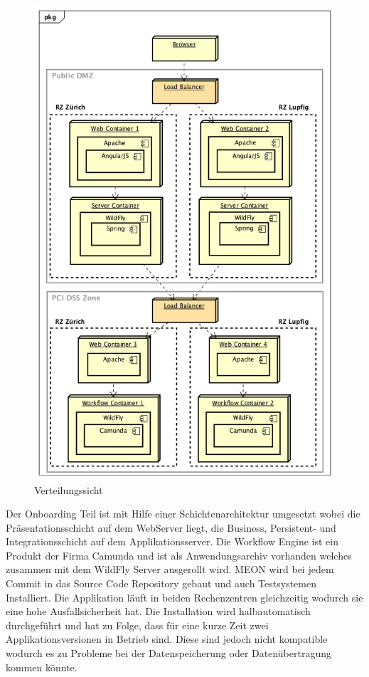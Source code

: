 \begin{figure}[H]
	\centering
	\includegraphics[scale=0.6]{CurrentDeployment.png}
	\caption{Verteilungssicht}
\end{figure}
Der Onboarding Teil ist mit Hilfe einer Schichtenarchitektur umgesetzt wobei die Präsentationsschicht auf dem WebServer liegt, die Business, Persistent- und Integrationsschicht auf dem Applikationsserver. Die Workflow Engine ist ein Produkt der Firma Camunda und ist als Anwendungsarchiv vorhanden welches zusammen mit dem WildFly Server ausgerollt wird. MEON wird bei jedem Commit in das Source Code Repository gebaut und auch Testsystemen Installiert.\newline
Die Applikation läuft in beiden Rechenzentren gleichzeitig wodurch sie eine hohe Ausfallsicherheit hat. Die Installation wird halbautomatisch durchgeführt und hat zu Folge, dass für eine kurze Zeit zwei Applikationsversionen in Betrieb sind. Diese sind jedoch nicht kompatible wodurch es zu Probleme bei der Datenspeicherung oder Datenübertragung kommen könnte.

